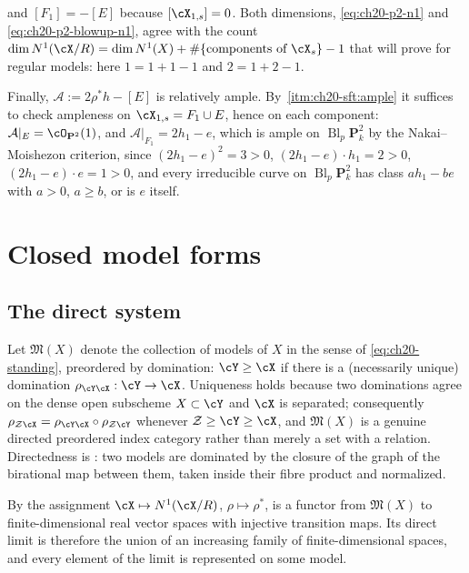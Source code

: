 \begin{example}
and $[F_1]=-[E]$ because $[\cX_{1,s}]=0$.  Both dimensions,
\eqref{eq:ch20-p2-n1} and \eqref{eq:ch20-p2-blowup-n1}, agree with the count
$\dim N^1(\cX/R)=\dim N^1(X)+\#\{\text{components of }\cX_s\}-1$ that
 will prove for regular models: here
$1=1+1-1$ and $2=1+2-1$.

Finally, $\mathcal A:=2\rho^*h-[E]$ is relatively ample.  By
\,\cref{itm:ch20-sft:ample} it suffices to
check ampleness on $\cX_{1,s}=F_1\cup E$, hence on each component:
$\mathcal A|_E=\cO_{\mathbf P^2}(1)$, and
$\mathcal A|_{F_1}=2h_1-e$, which is ample on
$\operatorname{Bl}_p\mathbf P^2_k$ by the Nakai--Moishezon criterion, since
$(2h_1-e)^2=3>0$, $(2h_1-e)\cdot h_1=2>0$, $(2h_1-e)\cdot e=1>0$, and
every irreducible curve on $\operatorname{Bl}_p\mathbf P^2_k$ has class
$ah_1-be$ with $a>0$, $a\ge b$, or is $e$ itself.
\end{example}

\section{Closed model forms}
\label{sec:ch20-model-forms}

\subsection{The direct system}
\label{sec:ch20-direct-system}

Let $\mathfrak M(X)$ denote the collection of models of $X$ in the sense
of \eqref{eq:ch20-standing}, preordered by domination: $\cY\geq\cX$ if
there is a (necessarily unique) domination $\rho_{\cY\cX}:\cY\to\cX$.
Uniqueness holds because two dominations agree on the dense open subscheme
$X\subset\cY$ and $\cX$ is separated; consequently
$\rho_{\mathcal Z\cX}=\rho_{\cY\cX}\circ\rho_{\mathcal Z\cY}$ whenever
$\mathcal Z\geq\cY\geq\cX$, and $\mathfrak M(X)$ is a genuine directed
preordered index category rather than merely a set with a relation.
Directedness is : two models are dominated by
the closure of the graph of the birational map between them, taken inside
their fibre product and normalized.

By  the assignment
$\cX\mapsto N^1(\cX/R)$, $\rho\mapsto\rho^*$, is a functor from
$\mathfrak M(X)$ to finite-dimensional real vector spaces with injective
transition maps.  Its direct limit is therefore the union of an increasing
family of finite-dimensional spaces, and every element of the limit is
represented on some model.

